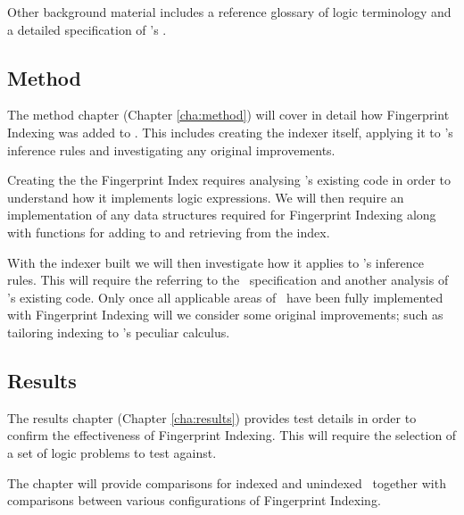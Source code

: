 Other background material includes a reference glossary of logic terminology and
a detailed specification of \beagle's \HSWAC.

\subsection{Method}

The method chapter (Chapter \ref{cha:method}) will cover in detail how Fingerprint
Indexing was added to \beagle. This includes creating the indexer itself, applying
it to \beagle's inference rules and investigating any original improvements.

Creating the the Fingerprint Index requires analysing \beagle's existing code
in order to understand how it implements logic expressions. We will then require
an implementation of any data structures required for Fingerprint Indexing along
with functions for adding to and retrieving from the index.

With the indexer built we will then investigate how it applies to \beagle's inference
rules. This will require the referring to the \HSWAC\ specification and another analysis of \beagle's existing code.
Only once all applicable areas of \beagle\ have been fully implemented with Fingerprint
Indexing will we consider some original improvements; such as tailoring indexing
to \beagle's peculiar calculus.

\subsection{Results}

The results chapter (Chapter \ref{cha:results}) provides test details
in order to confirm the effectiveness of Fingerprint Indexing. This will require
the selection of a set of logic problems to test against.

The chapter will provide comparisons for indexed and unindexed \beagle\ together
with comparisons between various configurations of Fingerprint Indexing.

